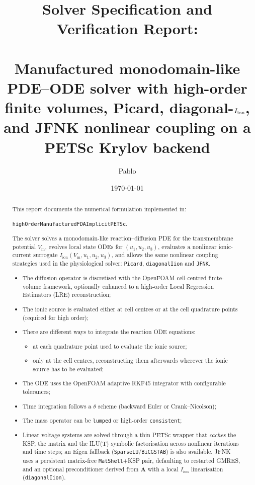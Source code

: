 \documentclass[11pt,a4paper]{article}
\title{Solver Specification and Verification Report:\\
       \texorpdfstring{\code{highOrderManufacturedFDAImplicitPETSc}}{highOrderManufacturedFDAImplicitPETSc}\\
       \large Manufactured monodomain-like PDE--ODE solver with high-order finite volumes,
       Picard, diagonal-\texorpdfstring{$\Iion$}{Iion}, and JFNK nonlinear coupling on a PETSc
       Krylov backend}
\author{Pablo}
\date{\today}
\newcommand{\code}[1]{\texttt{\small #1}}
\newcommand{\Vm}{V_{\text{m}}}
\newcommand{\Iion}{I_{\mathrm{ion}}}
\newcommand{\Aimp}{\mathbf{A}}
\begin{document}
\maketitle

\begin{abstract}
This report documents the numerical formulation implemented in:

\begin{center}
\code{highOrderManufacturedFDAImplicitPETSc}.
\end{center}

The solver solves a monodomain-like reaction--diffusion PDE for the
transmembrane potential $\Vm$, evolves local state ODEs for $(u_1,u_2,u_3)$,
evaluates a nonlinear ionic-current surrogate $\Iion(\Vm,u_1,u_2,u_3)$, and
allows the same nonlinear coupling strategies used in the physiological solver:
\code{Picard}, \code{diagonalIion} and \code{JFNK}.


\begin{itemize}
	\item The diffusion operator is discretised with the OpenFOAM cell-centred
	finite-volume framework, optionally enhanced to a high-order Local
	Regression Estimators (LRE) reconstruction;
	\item The ionic source is evaluated either at cell centres or at the cell
	quadrature points (required for high order);
	\item There are different ways to integrate the reaction ODE equations:
	\begin{itemize}
		\item[(i)] at each quadrature point used to evaluate the ionic source;
		\item[(ii)] only at the cell centres, reconstructing them afterwards wherever the ionic source has to be evaluated;
	\end{itemize}
	\item The ODE uses the OpenFOAM adaptive RKF45 integrator with configurable
	tolerances;
	\item Time integration follows a $\theta$ scheme (backward Euler or Crank--Nicolson);
	\item The mass operator can be \code{lumped} or high-order \code{consistent};
	\item Linear voltage systems are solved through a thin PETSc wrapper that
	\emph{caches} the KSP, the matrix and the ILU(T) symbolic factorisation across
	nonlinear iterations and time steps; an Eigen fallback
	(\code{SparseLU}/\code{BiCGSTAB}) is also available. JFNK uses a persistent
	matrix-free \code{MatShell}+KSP pair, defaulting to restarted GMRES, and an
	optional preconditioner derived from $\Aimp$ with a local $\Iion$
	linearisation (\code{diagonalIion}).
\end{itemize}


\end{abstract}
\end{document}
